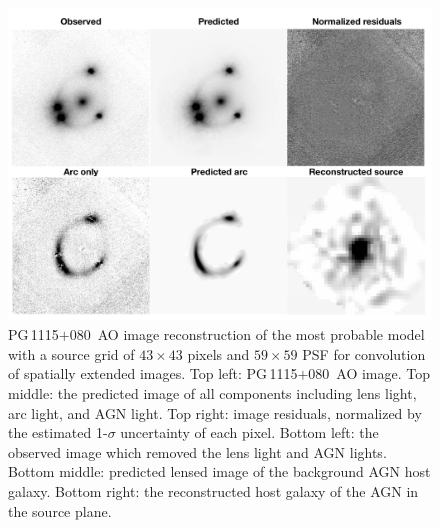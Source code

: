 \documentclass[useAMS,usenatbib]{mnras}
\newcommand\pg{PG\,1115$+$080}
\begin{document}
\begin{figure}
\centering
\includegraphics[scale=0.7]{PG1115_AO_image_1.png}
\caption{\pg~AO image reconstruction of the most probable model with a source grid of $43 \times 43$ pixels and $59 \times 59$ PSF for convolution of spatially extended images. Top left: \pg~AO image. Top middle: the predicted image of all components including lens light, arc light, and AGN light. Top right: image residuals, normalized by the estimated 1-$\sigma$ uncertainty of each pixel. Bottom left: the observed image which removed the lens light and AGN lights. Bottom middle: predicted lensed image of the background AGN host galaxy. Bottom right: the reconstructed host galaxy of the AGN in the source plane.}
\label{fig:PG1115_figure}
\end{figure}



\end{document}

